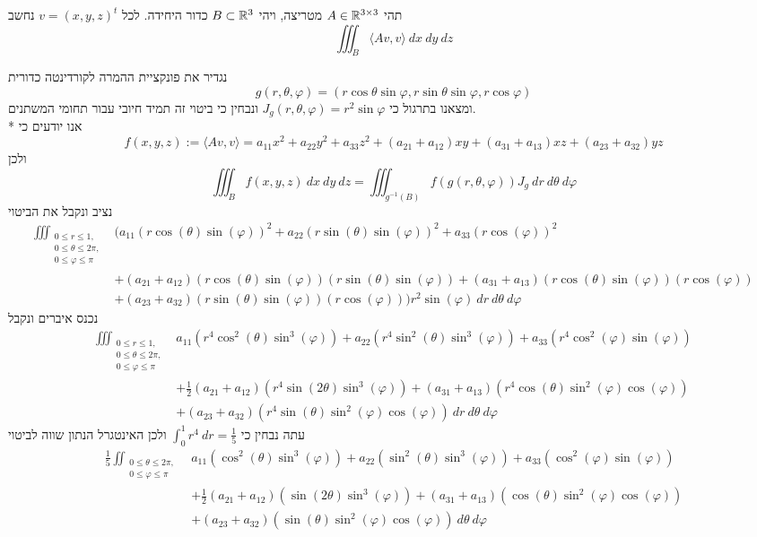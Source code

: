 \Question{}
תהי $A \in \mathbb{R}^{3 \times 3}$ מטריצה, ויהי $B \subset \mathbb{R}^3$ כדור היחידה.
לכל $v = {(x, y, z)}^t$ נחשב
\[
	\iiint_B \langle A v, v \rangle\ dx\ dy\ dz
\]

נגדיר את פונקציית ההמרה לקורדינטה כדורית
\[
	g(r, \theta, \varphi) = (r \cos \theta \sin \varphi, r \sin \theta \sin \varphi, r \cos \varphi)
\]
ומצאנו בתרגול כי $J_g(r, \theta, \varphi) = r^2 \sin \varphi$ ונבחין כי ביטוי זה תמיד חיובי עבור תחומי המשתנים. \\*
אנו יודעים כי
\[
	f(x, y, z) := \langle A v, v \rangle = a_{11} x^2 + a_{22} y^2 + a_{33} z^2 + (a_{21} + a_{12}) xy + (a_{31} + a_{13}) xz + (a_{23} + a_{32}) yz
\]
ולכן
\[
	\iiint_B f(x, y, z)\ dx\ dy\ dz
	= \iiint_{g^{-1}(B)} f(g(r, \theta, \varphi)) J_g\ dr\ d\theta\ d\varphi
\]
נציב ונקבל את הביטוי
\begin{align*}
	\iiint_{\substack{0 \le r \le 1, \\ 0 \le \theta \le 2\pi, \\ 0 \le \varphi \le \pi}}
	& (a_{11} {(r \cos(\theta) \sin(\varphi))}^2 + a_{22} {(r \sin(\theta) \sin(\varphi))}^2 + a_{33} {(r \cos(\varphi))}^2 \\
	& + (a_{21} + a_{12}) (r \cos(\theta) \sin(\varphi))(r \sin(\theta) \sin(\varphi)) + (a_{31} + a_{13}) (r \cos(\theta) \sin(\varphi))(r \cos(\varphi)) \\
	& + (a_{23} + a_{32}) (r \sin(\theta) \sin(\varphi))(r \cos(\varphi))) r^2 \sin(\varphi)\ dr\ d\theta\ d\varphi
\end{align*}
נכנס איברים ונקבל
\begin{align*}
	\iiint_{\substack{0 \le r \le 1, \\ 0 \le \theta \le 2\pi, \\ 0 \le \varphi \le \pi}}
	& a_{11} (r^4 \cos^2(\theta)\sin^3(\varphi)) + a_{22} (r^4 \sin^2(\theta)\sin^3(\varphi)) + a_{33} (r^4 \cos^2(\varphi) \sin(\varphi)) \\
	& + \frac{1}{2} (a_{21} + a_{12}) (r^4 \sin(2\theta) \sin^3(\varphi)) + (a_{31} + a_{13}) (r^4 \cos(\theta) \sin^2(\varphi) \cos(\varphi)) \\
	& + (a_{23} + a_{32}) (r^4 \sin(\theta) \sin^2(\varphi) \cos(\varphi))\ dr\ d\theta\ d\varphi
\end{align*}
עתה נבחין כי $\int_0^1 r^4\ dr = \frac{1}{5}$ ולכן האינטגרל הנתון שווה לביטוי
\begin{align*}
	\frac{1}{5} \iint_{\substack{0 \le \theta \le 2\pi, \\ 0 \le \varphi \le \pi}}
	& a_{11} (\cos^2(\theta)\sin^3(\varphi)) + a_{22} (\sin^2(\theta)\sin^3(\varphi)) + a_{33} (\cos^2(\varphi) \sin(\varphi)) \\
	& + \frac{1}{2} (a_{21} + a_{12}) (\sin(2\theta) \sin^3(\varphi)) + (a_{31} + a_{13}) (\cos(\theta) \sin^2(\varphi) \cos(\varphi)) \\
	& + (a_{23} + a_{32}) (\sin(\theta) \sin^2(\varphi) \cos(\varphi))\ d\theta\ d\varphi
\end{align*}
